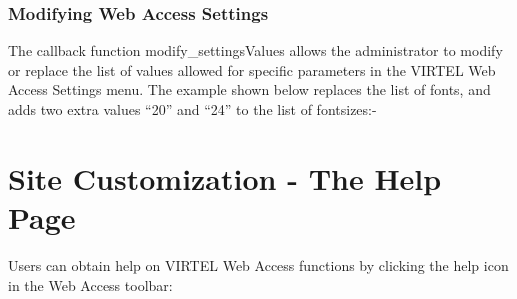 \documentclass[letterpaper,10pt,english]{sphinxmanual}
\begin{document}


\subsubsection{Modifying Web Access Settings}
\label{\detokenize{User_Guide:modifying-web-access-settings}}
The callback function modify\_settingsValues allows the administrator to modify or replace the list of values allowed for specific parameters in the VIRTEL Web Access Settings menu.
The example shown below replaces the list of fonts, and adds two extra values “20” and “24” to the list of fontsizes:-

\begin{sphinxVerbatim}[commandchars=\\\{\}]
       
      
   
   
 \PYG{p}{[}  \PYG{p}{]}
   
  
\end{sphinxVerbatim}



\section{Site Customization - The Help Page}
\label{\detokenize{User_Guide:site-customization-the-help-page}}
Users can obtain help on VIRTEL Web Access functions by clicking the help icon in the Web Access toolbar:
\end{document}
